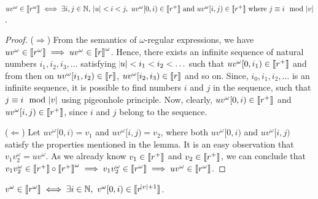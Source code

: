 \begin{prop}{\label{prop:w-membership}}
$uv^{\omega}\in {\llbracket}r^{\omega}{\rrbracket}\iff \exists i, j\in \mathbb{N},\ \abs{u}<i<j,\ uv^\omega[0,i)\in {\llbracket}r^+{\rrbracket}  \text{ and } uv^\omega[i,j) \in {\llbracket}r^+{\rrbracket} \text{ where } j\equiv i\mod \abs{v}$.
\end{prop}
\begin{proof}
 ($\Rightarrow$) From the semantics of $\omega$-regular expressions, we have $uv^\omega\in {\llbracket}r^\omega{\rrbracket}\implies uv^\omega\in{\llbracket}r{\rrbracket}^\omega$. Hence, there exists an infinite sequence of natural numbers $i_1, i_2, i_3, \ldots$ satisfying ${\abs{u}<i_1<i_2<\ldots}$ such that $uv^\omega[0,i_1)\in {\llbracket}r^+{\rrbracket}$ and from then on $uv^\omega[i_1,i_2)\in {\llbracket}r{\rrbracket}$, $uv^\omega[i_2,i_3)\in {\llbracket}r{\rrbracket}$ and so on. Since, $i_0,i_1,i_2, \ldots$ is an infinite sequence, it is possible to find numbers $i$ and $j$ in the sequence, such that $j\equiv i \mod \abs{v}$ using pigeonhole principle. Now, clearly, $uv^\omega[0,i)\in {\llbracket}r^+{\rrbracket}$ and $uv^\omega[i,j)\in {\llbracket}r^+{\rrbracket}$, since $i$ and $j$ belong to the sequence.

($\Leftarrow$) Let $uv^\omega[0,i)=v_1$ and $uv^\omega[i,j)=v_2$, where both $uv^\omega[0,i)$ and $uv^\omega[i,j)$ satisfy the properties mentioned in the lemma. It is an easy observation that $v_1v_2^{\omega}=uv^\omega$. As we already know ${v_1\in {\llbracket}r^+{\rrbracket}}$ and $v_2\in {\llbracket}r^+{\rrbracket}$, we can conclude that ${v_1v_2^\omega \in {\llbracket}r^+{\rrbracket}\circ {\llbracket}r^+{\rrbracket}^\omega \implies v_1v_2^\omega
\in{\llbracket}r^\omega{\rrbracket}\implies uv^\omega \in {\llbracket}r^\omega{\rrbracket}}$. 
\end{proof}
\begin{lemma}\label{lem:bound-r}
$v^{\omega}\in {\llbracket}r^\omega{\rrbracket}\iff\exists i \in \mathbb{N},\ v^\omega[0,i)\in {\llbracket}r^{\abs{v}+1}{\rrbracket}$.
\end{lemma}


